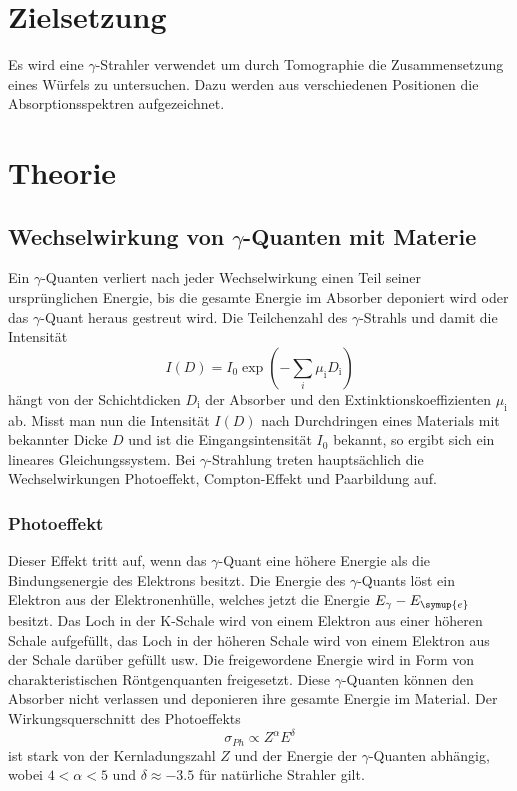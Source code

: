 \section{Zielsetzung}
\label{sec:Zielsetzung}
Es wird eine $\gamma$-Strahler verwendet um durch Tomographie die Zusammensetzung eines Würfels zu untersuchen.
Dazu werden aus verschiedenen Positionen die Absorptionsspektren aufgezeichnet.

\section{Theorie}
\label{sec:Theorie}

\subsection{Wechselwirkung von \texorpdfstring{$\gamma$}{gamma}-Quanten mit Materie}
\label{sec:WW}
Ein $\gamma$-Quanten verliert nach jeder Wechselwirkung einen Teil seiner ursprünglichen Energie, bis die gesamte Energie im Absorber deponiert wird oder das $\gamma$-Quant heraus gestreut wird.
Die Teilchenzahl des $\gamma$-Strahls und damit die Intensität
\begin{equation}
  \label{eq:Absorbtion}
  I(D)=I_0\exp(-\sum_i \mu_\text{i} D_\text{i})
\end{equation}
hängt von der Schichtdicken $D_\text{i}$ der Absorber und den Extinktionskoeffizienten $\mu_\text{i}$ ab. 
Misst man nun die Intensität $I(D)$ nach Durchdringen eines Materials mit bekannter Dicke $D$ und ist die Eingangsintensität $I_0$ bekannt, so ergibt sich ein lineares 
Gleichungssystem.
Bei $\gamma$-Strahlung treten hauptsächlich die Wechselwirkungen Photoeffekt, Compton-Effekt und Paarbildung auf.

\subsubsection{Photoeffekt}
\label{sec:PhEffekt}
Dieser Effekt tritt auf, wenn das $\gamma$-Quant eine höhere Energie als die Bindungsenergie des Elektrons besitzt.
Die Energie des $\gamma$-Quants löst ein Elektron aus der Elektronenhülle, welches jetzt die Energie $E_\gamma-E_{\symup{e}}$ besitzt.
Das Loch in der K-Schale wird von einem Elektron aus einer höheren Schale aufgefüllt, das Loch in der höheren Schale wird von einem Elektron aus der Schale darüber gefüllt usw.
Die freigewordene Energie wird in Form von charakteristischen Röntgenquanten freigesetzt.
Diese $\gamma$-Quanten können den Absorber nicht verlassen und deponieren ihre gesamte Energie im Material.
Der Wirkungsquerschnitt des Photoeffekts
\begin{equation*}
\sigma_{Ph}\propto Z^\alpha E^\delta
\end{equation*}
ist stark von der Kernladungszahl $Z$ und der Energie der $\gamma$-Quanten abhängig, wobei $\num{4}<\alpha<\num{5}$ und $\delta\approx \num{-3.5}$ für natürliche Strahler gilt.

